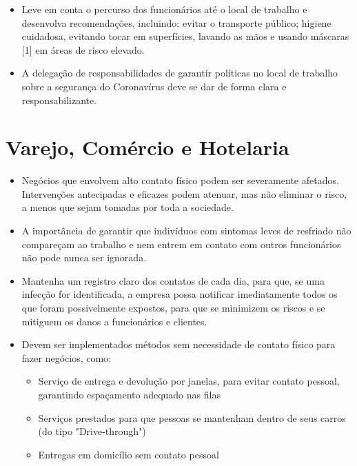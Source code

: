 \documentclass[onecolumn,journal]{IEEEtran}
\begin{document}
\begin{multicols}{2}
\begin{itemize}
\item Leve em conta o percurso dos funcionários até o local de trabalho e desenvolva recomendações, incluindo: evitar o transporte público; higiene cuidadosa, evitando tocar em superfícies, lavando as mãos e usando máscaras [1] em áreas de risco elevado.
\item A delegação de responsabilidades de garantir políticas no local de trabalho sobre a segurança do Coronavírus deve se dar de forma clara e responsabilizante.
\end{itemize}
%
\section*{Varejo, Comércio e Hotelaria}
\begin{itemize}
\item Negócios que envolvem alto contato físico podem ser severamente afetados. Intervenções antecipadas e eficazes podem atenuar, mas não eliminar o risco, a menos que sejam tomadas por toda a sociedade.
\item A importância de garantir que indivíduos com sintomas leves de resfriado não compareçam ao trabalho e nem entrem em contato com outros funcionários não pode nunca ser ignorada.
\item Mantenha um registro claro dos contatos de cada dia, para que, se uma infecção for identificada, a empresa possa notificar imediatamente todos os que foram possivelmente expostos, para que se minimizem os riscos e se mitiguem os danos a funcionários e clientes.
\item Devem ser implementados métodos sem necessidade de contato físico para fazer negócios, como:
  \begin{itemize}
    \item Serviço de entrega e devolução por janelas, para evitar contato pessoal, garantindo espaçamento adequado nas filas
    \item Serviços prestados para que pessoas se mantenham dentro de seus carros (do tipo "Drive-through")
    \item Entregas em domicílio sem contato pessoal
  \end{itemize}
\end{itemize}



\end{multicols}
\end{document}

